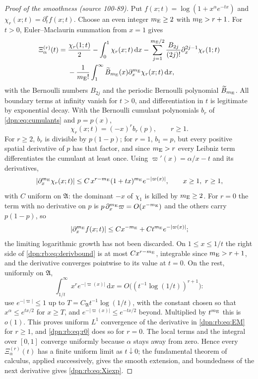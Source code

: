 \documentclass[11pt]{article}
\numberwithin{equation}{section}
\theoremstyle{definition}\newtheorem{definition}[theorem]{Definition}
\theoremstyle{remark}\newtheorem{remark}[theorem]{Remark}
\newcommand{\dd}{\,\mathrm d}\newcommand{\ii}{\mathrm i}
\newcommand{\src}[1]{\textup{(source #1)}}
\begin{document}
\begin{proof}[Proof of the smoothness \src{100-89}]
Put $f(x;t)=\log(1+x^\alpha e^{-tx})$ and $\chi_r(x;t)=\partial_t^rf(x;t)$.
Choose an even integer $m_{\rm E}\ge2$ with $m_{\rm E}>r+1$.  For $t>0$,
Euler--Maclaurin summation from $x=1$ gives
\begin{align}\label{dpn:rb:eq:EM}
 \Xi_\alpha^{(r)}(t)
 ={}&\frac{\chi_r(1;t)}2-\int_0^1\chi_r(x;t)\dd x
 -\sum_{j=1}^{m_{\rm E}/2}\frac{B_{2j}}{(2j)!}\partial_x^{2j-1}\chi_r(1;t)\\
 &-\frac1{m_{\rm E}!}\int_1^\infty\widetilde B_{m_{\rm E}}(x)
                          \partial_x^{m_{\rm E}}\chi_r(x;t)\dd x,\notag
\end{align}
with the Bernoulli numbers $B_{2j}$ and the periodic Bernoulli polynomial
$\widetilde B_{m_{\rm E}}$.  All boundary terms at infinity vanish for $t>0$,
and differentiation in $t$ is legitimate by exponential decay.  With the
Bernoulli cumulant polynomials $b_r$ of \eqref{dpn:eq:cumulants} and
$p=p(x)$,
\[
 \chi_r(x;t)=(-x)^rb_r(p),\qquad r\ge1.
\]
For $r\ge2$, $b_r$ is divisible by $p(1-p)$; for $r=1$, $b_1=p$, but every
positive spatial derivative of $p$ has that factor, and since $m_{\rm E}>r$
every Leibniz term differentiates the cumulant at least once.  Using
$\varpi'(x)=\alpha/x-t$ and its derivatives,
\begin{equation}\label{dpn:rb:eq:derivbound}
 |\partial_x^{m_{\rm E}}\chi_r(x;t)|
 \le C\,x^{r-m_{\rm E}}(1+tx)^{m_{\rm E}}e^{-|\varpi(x)|},\qquad
 x\ge1,\ r\ge1,
\end{equation}
with $C$ uniform on $\mathfrak A$: the dominant $-x$ of $\chi_1$ is killed by
$m_{\rm E}\ge2$.  For $r=0$ the term with no derivative on $p$ is
$p\,\partial_x^{m_{\rm E}}\varpi=O(x^{-m_{\rm E}})$ and the others carry
$p(1-p)$, so
\begin{equation}\label{dpn:rb:eq:r0}
 |\partial_x^{m_{\rm E}}f(x;t)|\le Cx^{-m_{\rm E}}+Ct^{m_{\rm E}}e^{-|\varpi(x)|};
\end{equation}
the limiting logarithmic growth has not been discarded.  On $1\le x\le1/t$
the right side of \eqref{dpn:rb:eq:derivbound} is at most $Cx^{r-m_{\rm E}}$,
integrable since $m_{\rm E}>r+1$, and the derivative converges pointwise to
its value at $t=0$.  On the rest, uniformly on $\mathfrak A$,
\begin{equation}\label{dpn:rb:eq:tail}
 \int_{1/t}^\infty x^re^{-|\varpi(x)|}\dd x
 =O\bigl((t^{-1}\log(1/t))^{r+1}\bigr):
\end{equation}
use $e^{-|\varpi|}\le1$ up to $T=C_{\mathfrak A}t^{-1}\log(1/t)$, with
the constant chosen so that $x^\alpha\le e^{tx/2}$ for $x\ge T$, and
$e^{-|\varpi(x)|}\le e^{-tx/2}$ beyond.  Multiplied by $t^{m_{\rm E}}$ this is
$o(1)$.  This proves uniform $L^1$ convergence of the derivative in
\eqref{dpn:rb:eq:EM} for $r\ge1$, and \eqref{dpn:rb:eq:r0} does so for $r=0$.
The local terms and the integral over $[0,1]$ converge uniformly because
$\alpha$ stays away from zero.  Hence every $\Xi_\alpha^{(r)}(t)$ has a finite
uniform limit as $t\downarrow0$; the fundamental theorem of calculus, applied
successively, gives the smooth extension, and boundedness of the next
derivative gives \eqref{dpn:rb:eq:Xiexp}.
\end{proof}
\end{document}
